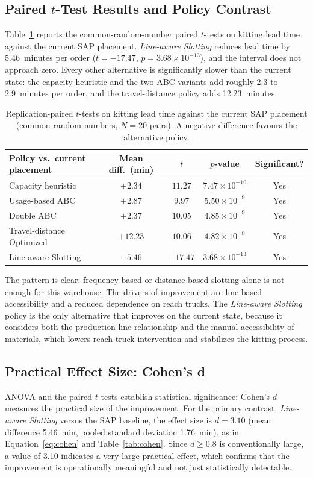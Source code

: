 \documentclass[conference]{IEEEtran}
\newcommand{\policy}[1]{\textit{#1}}
\begin{document}
\subsection{Paired \texorpdfstring{$t$}{t}-Test Results and Policy Contrast}
\label{sec:res-paired}
Table~\ref{tab:paired} reports the common-random-number paired $t$-tests on
kitting lead time against the current SAP placement. \policy{Line-aware
Slotting} reduces lead time by 5.46~minutes per order ($t=-17.47$,
$p=3.68\times10^{-13}$), and the interval does not approach zero. Every other
alternative is significantly slower than the current state: the capacity
heuristic and the two ABC variants add roughly 2.3 to 2.9~minutes per order,
and the travel-distance policy adds 12.23~minutes.

\begin{table}[htbp]
\centering
\caption{Replication-paired $t$-tests on kitting lead time against the current
SAP placement (common random numbers, $N=20$ pairs). A negative difference
favours the alternative policy.}
\label{tab:paired}
\begin{tabular}{lcccc}
\toprule
Policy vs.\ current placement & Mean diff.\ (min) & $t$ & $p$-value & Significant? \\
\midrule
Capacity heuristic & $+2.34$ & $11.27$ & $7.47\times10^{-10}$ & Yes \\
Usage-based ABC & $+2.87$ & $9.97$ & $5.50\times10^{-9}$ & Yes \\
Double ABC & $+2.37$ & $10.05$ & $4.85\times10^{-9}$ & Yes \\
Travel-distance Optimized & $+12.23$ & $10.06$ & $4.82\times10^{-9}$ & Yes \\
Line-aware Slotting & $-5.46$ & $-17.47$ & $3.68\times10^{-13}$ & Yes \\
\bottomrule
\end{tabular}
\end{table}

The pattern is clear: frequency-based or distance-based slotting alone is not
enough for this warehouse. The drivers of improvement are line-based
accessibility and a reduced dependence on reach trucks. The
\policy{Line-aware Slotting} policy is the only alternative that improves on
the current state, because it considers both the production-line relationship
and the manual accessibility of materials, which lowers reach-truck
intervention and stabilizes the kitting process.

\subsection{Practical Effect Size: Cohen's d}
\label{sec:res-cohen}
ANOVA and the paired $t$-tests establish statistical significance; Cohen's $d$
measures the practical size of the improvement. For the primary contrast,
\policy{Line-aware Slotting} versus the SAP baseline, the effect size is
$d=3.10$ (mean difference 5.46~min, pooled standard deviation 1.76~min), as in
Equation~\eqref{eq:cohen} and Table~\ref{tab:cohen}. Since $d \ge 0.8$ is
conventionally large, a value of 3.10 indicates a very large practical effect,
which confirms that the improvement is operationally meaningful and not just
statistically detectable.
\end{document}
